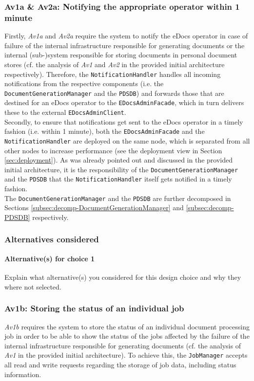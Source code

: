 \documentclass[a4paper,10pt]{article}
\begin{document}
\subsubsection{Av1a \& Av2a\@: Notifying the appropriate operator within 1 minute}\label{subsubsec:Av1a-Av2a}
Firstly, \textit{Av1a} and \textit{Av2a} require the system to notify the eDocs operator in case of failure of the internal infrastructure responsible for generating documents or the internal (sub-)system responsible for storing documents in personal document stores (cf. the analysis of \textit{Av1} and \textit{Av2} in the provided initial architecture respectively). Therefore, the \texttt{NotificationHandler} handles all incoming notifications from the respective components (i.e. the \texttt{DocumentGenerationManager} and the \texttt{PDSDB}) and forwards those that are destined for an eDocs operator to the \texttt{EDocsAdminFacade}, which in turn delivers these to the external \texttt{EDocsAdminClient}.\\
Secondly, to ensure that notifications get sent to the eDocs operator in a timely fashion (i.e. within 1 minute), both the \texttt{EDocsAdminFacade} and the \texttt{NotificationHandler} are deployed on the same node, which is separated from all other nodes to increase performance (see the deployment view in Section \ref{sec:deployment}). As was already pointed out and discussed in the provided initial architecture, it is the responsibility of the \texttt{DocumentGenerationManager} and the \texttt{PDSDB} that the \texttt{NotificationHandler} itself gets notified in a timely fashion.\\
The \texttt{DocumentGenerationManager} and the \texttt{PDSDB} are further decomposed in Sections \ref{subsec:decomp-DocumentGenerationManager} and \ref{subsec:decomp-PDSDB} respectively.
\subsubsection*{Alternatives considered}
\paragraph{Alternative(s) for choice 1} Explain what alternative(s) you
considered for this design choice and why they where not selected.

\subsubsection{Av1b\@: Storing the status of an individual job}\label{subsubsec:Av1b}
\textit{Av1b} requires the system to store the status of an individual document processing job in order to be able to show the status of the jobs affected by the failure of the internal infrastructure responsible for generating documents (cf. the analysis of \textit{Av1} in the provided initial architecture). To achieve this, the \texttt{JobManager} accepts all read and write requests regarding the storage of job data, including status information.
\end{document}
